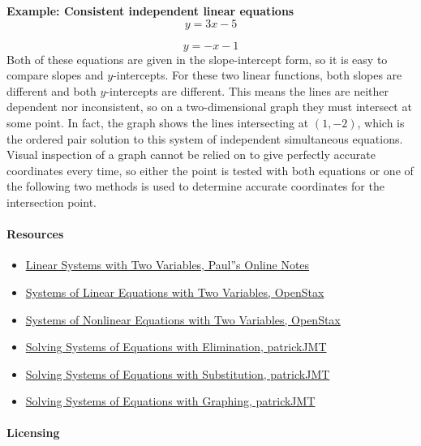 \textbf{Example: Consistent independent linear equations}
$$
y = 3x - 5
$$

$$
y = -x - 1
$$
Both of these equations are given in the slope-intercept form, so it is easy to compare slopes and $y$-intercepts. For these two linear functions, both slopes are different and both $y$-intercepts are different. This means the lines are neither dependent nor inconsistent, so on a two-dimensional graph they must intersect at some point. In fact, the graph shows the lines intersecting at $(1, -2)$, which is the ordered pair solution to this system of independent simultaneous equations. Visual inspection of a graph cannot be relied on to give perfectly accurate coordinates every time, so either the point is tested with both equations or one of the following two methods is used to determine accurate coordinates for the intersection point.


\paragraph{Resources}

\begin{itemize}
    \item \href{https://tutorial.math.lamar.edu/classes/alg/systemstwovrble.aspx}{Linear Systems with Two Variables, Paul''s Online Notes}
    \item \href{https://openstax.org/books/college-algebra/pages/7-1-systems-of-linear-equations-two-variables}{Systems of Linear Equations with Two Variables, OpenStax}
    \item \href{https://openstax.org/books/college-algebra/pages/7-3-systems-of-nonlinear-equations-and-inequalities-two-variables}{Systems of Nonlinear Equations with Two Variables, OpenStax}
    \item \href{https://www.youtube.com/watch?v=ej25myhYcSg}{Solving Systems of Equations with Elimination, patrickJMT}
    \item \href{https://www.youtube.com/watch?v=cwHR_B9zK7k}{Solving Systems of Equations with Substitution, patrickJMT}
    \item \href{https://www.youtube.com/watch?v=WNkPKv0OTGI}{Solving Systems of Equations with Graphing, patrickJMT}
\end{itemize}

\paragraph{Licensing}

